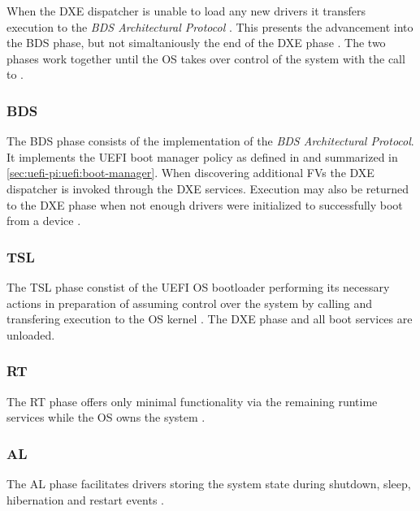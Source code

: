 When the \ac{DXE} dispatcher is unable to load any new drivers it transfers execution to the \emph{\ac{BDS} Architectural Protocol} \cite[Vol. 2, 2.4]{pi-spec}.
This presents the advancement into the \ac{BDS} phase, but not simaltaniously the end of the \ac{DXE} phase \cite[Vol. 2, 2.1]{pi-spec}.
The two phases work together until the \ac{OS} takes over control of the system with the call to .

\subsubsection{\acf{BDS}}

The \ac{BDS} phase consists of the implementation of the \emph{\ac{BDS} Architectural Protocol}.
It implements the \ac{UEFI} boot manager policy as defined in \cite[Section 3]{uefi-spec} and summarized in \autoref{sec:uefi-pi:uefi:boot-manager}.
When discovering additional \acp{FV} the \ac{DXE} dispatcher is invoked through the \ac{DXE} services.
Execution may also be returned to the \ac{DXE} phase when not enough drivers were initialized to successfully boot from a device \cite[Vol. 2, 12.2]{pi-spec}.


\subsubsection{\acf{TSL}}

The \ac{TSL} phase constist of the \ac{UEFI} \ac{OS} bootloader performing its necessary actions in preparation of assuming control over the system by calling  and transfering execution to the \ac{OS} kernel \cite[Section 2.3]{tianocore-edk2-build-spec}.
The \ac{DXE} phase and all boot services are unloaded.

\subsubsection{\acf{RT}}

The \ac{RT} phase offers only minimal functionality via the remaining runtime services while the \ac{OS} owns the system \cite[Section 2.3]{tianocore-edk2-build-spec}.

\subsubsection{\acf{AL}}

The \ac{AL} phase facilitates drivers storing the system state during shutdown, sleep, hibernation and restart events \cite[Section 2.3]{tianocore-edk2-build-spec}.
